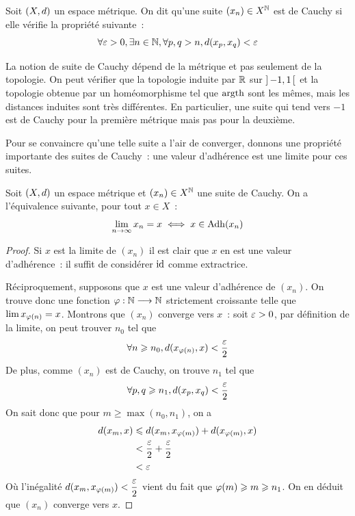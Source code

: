 \begin{definition}
  Soit $(X,d)$ un espace métrique. On dit qu'une suite
  $(x_n)\in X^{\mathbb N}$ est de Cauchy si elle vérifie la propriété suivante~:
  \[\forall \varepsilon > 0, \exists n \in \mathbb N, \forall p,q > n,
  d(x_p,x_q) < \varepsilon\]
\end{definition}

\begin{remark}
  La notion de suite de Cauchy dépend de la métrique et pas seulement de la
  topologie. On peut vérifier que la topologie induite par $\mathbb R$ sur
  $\mathord{\left]\,-1,1\,\right[}$ et la topologie obtenue par un homéomorphisme tel que
  $\operatorname{argth}$ sont les mêmes, mais les distances induites sont très
  différentes. En particulier, une suite qui tend vers $-1$ est de Cauchy pour
  la première métrique mais pas pour la deuxième.
\end{remark}

Pour se convaincre qu'une telle suite a l'air de converger, donnons une
propriété importante des suites de Cauchy~: une valeur d'adhérence est une
limite pour ces suites.

\begin{property}\label{prop.cauchy.adh}
  Soit $(X,d)$ un espace métrique et $(x_n)\in X^{\mathbb N}$ une suite de
  Cauchy. On a l'équivalence suivante, pour tout $x \in X$~:
  \[\lim_{n\to\infty} x_n = x \iff x \in \operatorname{Adh}(x_n)\]
\end{property}

\begin{proof}
  Si $x$ est la limite de $(x_n)$ il est clair que $x$ en est une valeur
  d'adhérence~: il suffit de considérer $\operatorname{id}$ comme extractrice.

  Réciproquement, supposons que $x$ est une valeur d'adhérence de $(x_n)$. On
  trouve donc une fonction $\varphi : \displaystyle \mathbb N \longrightarrow \mathbb N$ strictement
  croissante telle que $\lim x_{\varphi(n)} = x$. Montrons que $(x_n)$ converge
  vers $x$~: soit $\varepsilon > 0$, par définition de la limite, on peut
  trouver $n_0$ tel que
  \[\forall n \geqslant n_0, d(x_{\varphi(n)},x) < \frac{\varepsilon}{2}\]
  De plus, comme $(x_n)$ est de Cauchy, on trouve $n_1$ tel que
  \[\forall p,q \geqslant n_1, d(x_p,x_q) < \frac{\varepsilon}{2}\]
  On sait donc que pour $m \geq \max(n_0,n_1)$, on a
  \begin{align*}
    d(x_m,x) &\leqslant d(x_m,x_{\varphi(m)}) + d(x_{\varphi(m)},x) \\
    &< \frac{\varepsilon}{2} + \frac{\varepsilon}{2}\\
    &< \varepsilon
  \end{align*}
  Où l'inégalité $d(x_m,x_{\varphi(m)}) < \dfrac{\varepsilon}{2}$ vient du
  fait que $\varphi(m) \geqslant m \geqslant n_1$. On en déduit que $(x_n)$ converge vers
  $x$.
\end{proof}

